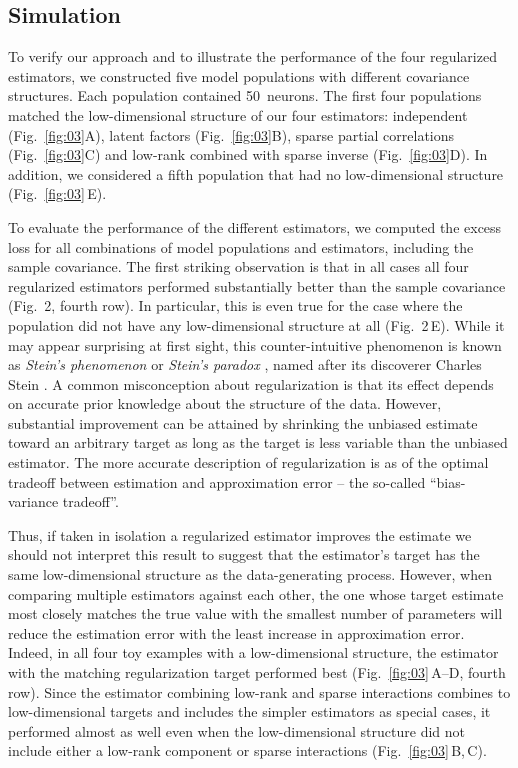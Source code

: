 \documentclass[10pt]{article}
\begin{document}
\subsection*{Simulation}
To verify our approach and to illustrate the performance of the four regularized estimators, we constructed five model populations with different covariance structures. Each population contained 50~neurons. 
The first four populations matched the low-dimensional structure of our four estimators: independent (Fig.~\ref{fig:03}A), latent factors (Fig.~\ref{fig:03}B), sparse partial correlations (Fig.~\ref{fig:03}C) and low-rank combined with sparse inverse (Fig.~\ref{fig:03}D).  
In addition, we considered a fifth population that had no low-dimensional structure (Fig.~\ref{fig:03}\,E).

To evaluate the performance of the different estimators, we computed the excess loss for all combinations of model populations and estimators, including the sample covariance. The first striking observation is that in all cases all four regularized estimators performed substantially better than the sample covariance (Fig.~2, fourth row). In particular, this is even true for the case where the population did not have any low-dimensional structure at all (Fig.~2\,E). While it may appear surprising at first sight, this counter-intuitive phenomenon is known as \emph{Stein's phenomenon} or \emph{Stein's paradox} \cite{Efron:1977}, named after its discoverer Charles Stein \cite{Stein:1956}. A common misconception about regularization is that its effect depends on accurate prior knowledge about the structure of the data. However, substantial improvement can be attained by shrinking the unbiased estimate toward an arbitrary target as long as the target is less variable than the unbiased estimator. The more accurate description of regularization is as of the optimal tradeoff between estimation and approximation error -- the so-called ``bias-variance tradeoff''.

Thus, if taken in isolation a regularized estimator improves the estimate we should not interpret this result to suggest that the estimator's target has the same low-dimensional structure as the data-generating process. However, when comparing multiple estimators against each other, the one whose target estimate most closely matches the true value with the smallest number of parameters will reduce the estimation error with the least increase in approximation error. Indeed, in all four toy examples with a low-dimensional structure, the estimator with the matching regularization target performed best (Fig.~\ref{fig:03}\,A--D, fourth row). 
Since the estimator combining low-rank and sparse interactions combines to low-dimensional targets and includes the simpler estimators as special cases, it performed almost as well even when the low-dimensional structure did not include either a low-rank component or sparse interactions (Fig.~\ref{fig:03}\,B,\,C). 
\end{document}
